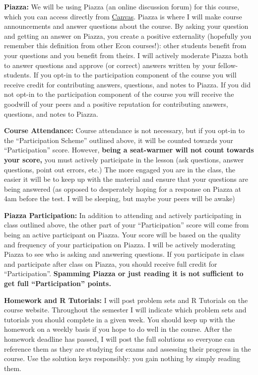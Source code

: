 \documentclass[11pt, letterpaper]{article}
\begin{document}
\medskip

\noindent \textbf{Piazza:} 
We will be using Piazza (an online discussion forum) for this course, which you can access directly from \href{http://upenn.instructure.com}{Canvas}. 
Piazza is where I will make course announcements and answer questions about the course.
By asking your question and getting an answer on Piazza, you create a positive externality (hopefully you remember this definition from other Econ courses!): other students benefit from your questions and you benefit from theirs. 
I will actively moderate Piazza both to answer questions and approve (or correct) answers written by your fellow-students.
If you opt-in to the participation component of the course you will receive credit for contributing answers, questions, and notes to Piazza. 
If you did not opt-in to the participation component of the course you will receive the goodwill of your peers and a positive reputation for contributing answers, questions, and notes to Piazza. 

\medskip

\noindent \textbf{Course Attendance:}
Course attendance is not necessary, but if you opt-in to the ``Participation Scheme'' outlined above, it will be counted towards your ``Participation'' score. 
However, \textbf{being a seat-warmer will not count towards your score,} you must actively participate in the lesson (ask questions, answer questions, point out errors, etc.)
The more engaged you are in the class, the easier it will be to keep up with the material and ensure that your questions are being answered (as opposed to desperately hoping for a response on Piazza at 4am before the test. I will be sleeping, but maybe your peers will be awake)

\medskip

\noindent \textbf{Piazza Participation:}
In addition to attending and actively participating in class outlined above, the other part of your ``Participation'' score will come from being an active participant on Piazza. Your score will be based on the quality and frequency of your participation on Piazza. I will be actively moderating Piazza to see who is asking and answering questions. If you participate in class and participate after class on Piazza, you should receive full credit for ``Participation''. \textbf{Spamming Piazza or just reading it is not sufficient to get full ``Participation'' points.}

\medskip 

\noindent \textbf{Homework and R Tutorials:} 
I will post problem sets and R Tutorials on the course website.
Throughout the semester I will indicate which problem sets and tutorials you should complete in a given week.
You should keep up with the homework on a weekly basis if you hope to do well in the course.
After the homework deadline has passed, I will post the full solutions so everyone can reference them as they are studying for exams and assessing their progress in the course.
Use the solution keys responsibly: you gain nothing by simply reading them.
\end{document}
